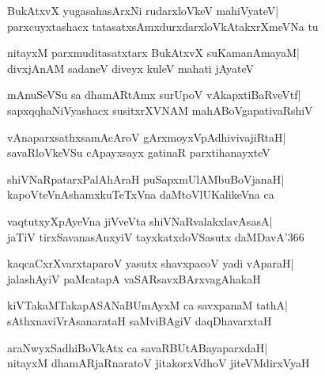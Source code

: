 \documentclass[twoside,12pt,openright]{book}
\newcounter{shloka}[chapter]
\begin{document}
\begin{shloka}%
BukAtxvX yugasahasArxNi rudarxloVkeV mahiVyateV|\\
parxcuyxtashacx tatasatxsAmxdurxdarxloVkAtakxrXmeVNa tu
\end{shloka}

\begin{shloka}%
nitayxM parxmuditasatxtarx BukAtxvX suKamanAmayaM|\\
divxjAnAM sadaneV diveyx kuleV mahati jAyateV
\end{shloka}

\begin{shloka}%
mAnuSeVSu sa dhamARtAmx surUpoV vAkapxtiBaRveVtf|\\
sapxqqhaNiVyashacx susitxrXVNAM mahABoVgapativaRshiV
\end{shloka}

\begin{shloka}%
vAnaparxsathxsamAcAroV gArxmoyxVpAdhivivajiRtaH|\\
savaRloVkeVSu cApayxsayx gatinaR parxtihanayxteV
\end{shloka}

\begin{shloka}%
shiVNaRpatarxPalAhAraH puSapxmUlAMbuBoVjanaH|\\
kapoVteVnAshamxkuTeTxVna daMtoVlUKalikeVna ca 
\end{shloka}

\begin{shloka}%
vaqtutxyXpAyeVna jiVveVta shiVNaRvalakxlavAsasA|\\
jaTiV tirxSavanasAnxyiV tayxkatxdoVSasutx daMDavA\char'366
\end{shloka}

\begin{shloka}%
kaqcaCxrXvarxtaparoV yasutx shavxpacoV yadi vAparaH|\\
jalashAyiV paMcatapA vaSARsavxBArxvagAhakaH
\end{shloka}

\begin{shloka}%
kiVTakaMTakapASANaBUmAyxM ca savxpanaM tathA|\\
sAthxnaviVrAsanarataH saMviBAgiV daqDhavarxtaH
\end{shloka}

\begin{shloka}%
araNwyxSadhiBoVkAtx ca savaRBUtABayaparxdaH|\\
nitayxM dhamARjaRnaratoV jitakorxVdhoV jiteVMdirxVyaH
\end{shloka}
\end{document}
